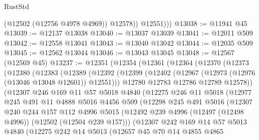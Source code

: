 \begin{lexlean}{RustStd}
\begin{coremodule}
              (@12502 (@12756 @4978 @4969))
              @12578))
          @12551)))
@13038 := @11941 @45
@13039 := @12137 @13038
@13040 := @13037 @13039
@13041 := @12011 @509
@13042 := @12558 @13041
@13043 := @13040 @13042
@13044 := @12035 @509
@13045 := @12562 @13044
@13046 := @13043 @13045
@13048 := @12567 (@12569 @45)
@13237 := @12351
    (@12354
      (@12361
        (@12364
          (@12370
            (@12373
              (@12380
                (@12383
                  (@12389
                    (@12392
                      (@12399
                        (@12402 (@12967 (@12973 (@12976 (@13046 @13048 @12601)) @12551)))
                        @12780
                        @12783
                        @12786
                        @12789
                        @12578))
                    (@12307
                      @246
                      @169
                      @11
                      @57
                      @5018
                      @4840
                      (@12275
                        @246
                        @11
                        @5018
                        (@12977
                          @245
                          @491
                          @11
                          @4888
                          @5016
                          @4456
                          @509
                          (@12298
                            @245
                            @491
                            @5016
                            (@12307
                              @240
                              @244
                              @157
                              @112
                              @4996
                              @5015
                              (@12492
                                @239
                                @4996
                                (@12497 (@12498 @4996))
                                (@12502 (@12504 @239 @157)))
                              (@12307
                                @242
                                @169
                                @14
                                @57
                                @5013
                                @4840
                                (@12275
                                  @242
                                  @14
                                  @5013
                                  (@12657
                                    @45
                                    @70
                                    @14
                                    @4855
                                    @4865

\end{coremodule}
\end{lexlean}
